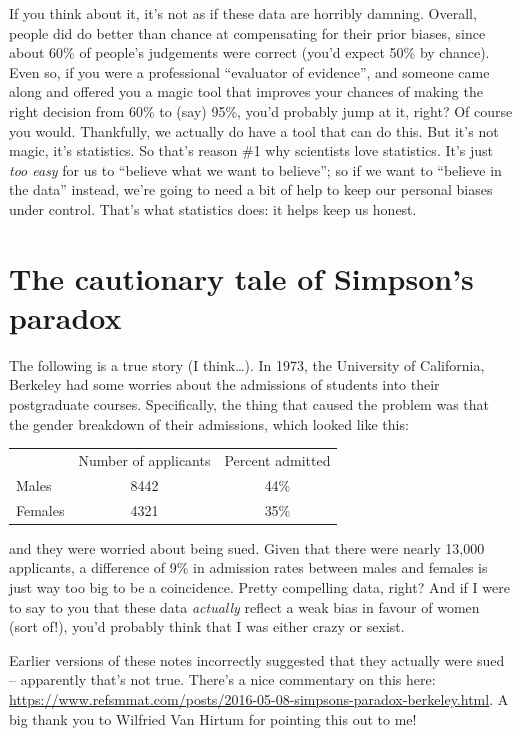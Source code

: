 \documentclass[]{book}
\begin{document}
If you think about it, it's not as if these data are horribly damning. Overall, people did do better than chance at compensating for their prior biases, since about 60\% of people's judgements were correct (you'd expect 50\% by chance). Even so, if you were a professional ``evaluator of evidence'', and someone came along and offered you a magic tool that improves your chances of making the right decision from 60\% to (say) 95\%, you'd probably jump at it, right? Of course you would. Thankfully, we actually do have a tool that can do this. But it's not magic, it's statistics. So that's reason \#1 why scientists love statistics. It's just \emph{too easy} for us to ``believe what we want to believe''; so if we want to ``believe in the data'' instead, we're going to need a bit of help to keep our personal biases under control. That's what statistics does: it helps keep us honest.

\hypertarget{the-cautionary-tale-of-simpsons-paradox}{%
\section{The cautionary tale of Simpson's paradox}\label{the-cautionary-tale-of-simpsons-paradox}}

The following is a true story (I think\ldots{}). In 1973, the University of California, Berkeley had some worries about the admissions of students into their postgraduate courses. Specifically, the thing that caused the problem was that the gender breakdown of their admissions, which looked like this:

\begin{longtable}[]{@{}lcc@{}}
\toprule
\endhead
& Number of applicants & Percent admitted\tabularnewline
Males & 8442 & 44\%\tabularnewline
Females & 4321 & 35\%\tabularnewline
\bottomrule
\end{longtable}

and they were worried about being sued. Given that there were nearly 13,000 applicants, a difference of 9\% in admission rates between males and females is just way too big to be a coincidence. Pretty compelling data, right? And if I were to say to you that these data \emph{actually} reflect a weak bias in favour of women (sort of!), you'd probably think that I was either crazy or sexist.

Earlier versions of these notes incorrectly suggested that they actually were sued -- apparently that's not true. There's a nice commentary on this here: \url{https://www.refsmmat.com/posts/2016-05-08-simpsons-paradox-berkeley.html}. A big thank you to Wilfried Van Hirtum for pointing this out to me!
\end{document}
